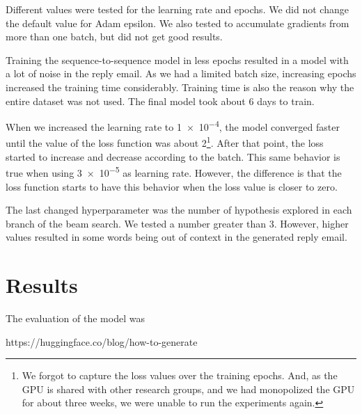 \documentclass[letterpaper]{article}
\begin{document}
Different values were tested for the learning rate and epochs. We did not change the default value for Adam epsilon. We also tested to accumulate gradients from more than one batch, but did not get good results.

Training the sequence-to-sequence model in less epochs resulted in a model with a lot of noise in the reply email. As we had a limited batch size, increasing epochs increased the training time considerably. Training time is also the reason why the entire dataset was not used. The final model took about \num{6} days to train.

When we increased the learning rate to \num{1e-4}, the model converged faster until the value of the loss function was about \num{2}\footnote{We forgot to capture the loss values over the training epochs. And, as the GPU is shared with other research groups, and we had monopolized the GPU for about three weeks, we were unable to run the experiments again.}. After that point, the loss started to increase and decrease according to the batch. This same behavior is true when using \num{3e-5} as learning rate. However, the difference is that the loss function starts to have this behavior when the loss value is closer to zero.

The last changed hyperparameter was the number of hypothesis explored in each branch of the beam search. We tested a number greater than \num{3}. However, higher values resulted in some words being out of context in the generated reply email.


\section{Results}

The evaluation of the model was



https://huggingface.co/blog/how-to-generate





\end{document}
